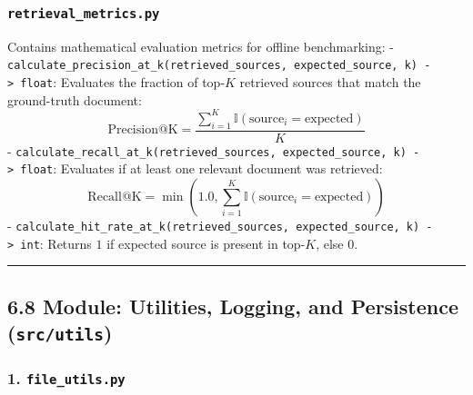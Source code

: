 \documentclass[
]{article}
\begin{document}
\subsubsection{\texorpdfstring{\texttt{retrieval\_\allowbreak metrics.\allowbreak py}}{retrieval\_metrics.py}}\label{retrieval_metrics.py}

Contains mathematical evaluation metrics for offline benchmarking: -
\texttt{calculate\_\allowbreak precision\_\allowbreak at\_\allowbreak k(\allowbreak retrieved\_\allowbreak sources,\allowbreak \ \allowbreak expected\_\allowbreak source,\allowbreak \ \allowbreak k)\allowbreak \ \allowbreak -\textgreater{}\allowbreak \ \allowbreak float}:
Evaluates the fraction of top-\(K\) retrieved sources that match the
ground-truth document:
\[\text{Precision@K} = \frac{\sum_{i=1}^K \mathbb{I}(\text{source}_i = \text{expected})}{K}\]
-
\texttt{calculate\_\allowbreak recall\_\allowbreak at\_\allowbreak k(\allowbreak retrieved\_\allowbreak sources,\allowbreak \ \allowbreak expected\_\allowbreak source,\allowbreak \ \allowbreak k)\allowbreak \ \allowbreak -\textgreater{}\allowbreak \ \allowbreak float}:
Evaluates if at least one relevant document was retrieved:
\[\text{Recall@K} = \min\left(1.0, \sum_{i=1}^K \mathbb{I}(\text{source}_i = \text{expected})\right)\]
-
\texttt{calculate\_\allowbreak hit\_\allowbreak rate\_\allowbreak at\_\allowbreak k(\allowbreak retrieved\_\allowbreak sources,\allowbreak \ \allowbreak expected\_\allowbreak source,\allowbreak \ \allowbreak k)\allowbreak \ \allowbreak -\textgreater{}\allowbreak \ \allowbreak int}:
Returns \(1\) if expected source is present in top-\(K\), else \(0\).

\begin{center}\rule{0.5\linewidth}{0.5pt}\end{center}

\subsection{\texorpdfstring{6.8 Module: Utilities, Logging, and
Persistence
(\texttt{src/\allowbreak utils})}{6.8 Module: Utilities, Logging, and Persistence (src/utils)}}\label{module-utilities-logging-and-persistence-srcutils}

\subsubsection{\texorpdfstring{1.
\texttt{file\_\allowbreak utils.\allowbreak py}}{1. file\_utils.py}}\label{file_utils.py}
\end{document}
